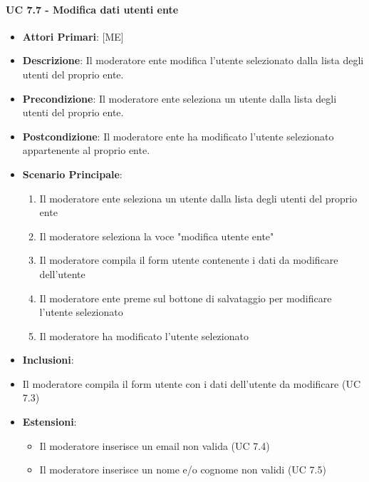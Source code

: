 			\paragraph{UC 7.7 - Modifica dati utenti ente}
			\begin{itemize}
				\item \textbf{Attori Primari}: [ME]
				\item \textbf{Descrizione}: Il moderatore ente modifica l'utente selezionato dalla lista degli utenti del proprio ente.
				\item \textbf{Precondizione}: Il moderatore ente seleziona un utente dalla lista degli utenti del proprio ente.
				\item \textbf{Postcondizione}: Il moderatore ente ha modificato l'utente selezionato appartenente al proprio ente.
				\item \textbf{Scenario Principale}:
				\begin{enumerate}
					\item{Il moderatore ente seleziona un utente dalla lista degli utenti del proprio ente}
					\item{Il moderatore seleziona la voce "modifica utente ente"}
					\item{Il moderatore compila il form utente contenente i dati da modificare dell'utente}
					\item{Il moderatore ente preme sul bottone di salvataggio per modificare l'utente selezionato}
					\item{Il moderatore ha modificato l'utente selezionato}
				\end{enumerate}	
				\item \textbf{Inclusioni}:
					\item Il moderatore compila il form utente con i dati dell'utente da modificare (UC 7.3)
				\item \textbf{Estensioni}:
				\begin{itemize}
					\item Il moderatore inserisce un email non valida (UC 7.4)
					\item Il moderatore inserisce un nome e/o cognome non validi (UC 7.5)
				\end{itemize}
			\end{itemize}
			
